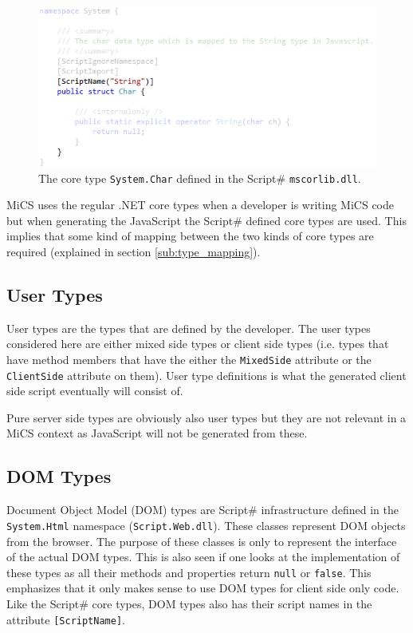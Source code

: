 	\begin{figure}[H]
			\includegraphics[width=13cm]{resources/images/Char.png}
		\caption{The core type \texttt{System.Char} defined in the Script\# \texttt{mscorlib.dll}.}
		\label{char}
	\end{figure}

		MiCS uses the regular .NET core types when a developer is writing MiCS code but when generating the JavaScript the Script\# defined core types are used. This implies that some kind of mapping between the two kinds of core types are required (explained in section \ref{sub:type_mapping}).

	\subsection{User Types} %
	\label{sub:user_types}
		User types are the types that are defined by the developer. The user types considered here are either mixed side types or client side types (i.e. types that have method members that have the either the \texttt{MixedSide} attribute or the \texttt{ClientSide} attribute on them). User type definitions is what the generated client side script eventually will consist of. 

		Pure server side types are obviously also user types but they are not relevant in a MiCS context as JavaScript will not be generated from these.

	\subsection{DOM Types} %
	\label{sub:dom_types}
		Document Object Model (DOM) types are Script\# infrastructure defined in the \texttt{System.Html} namespace (\texttt{Script.Web.dll}). These classes represent DOM objects from the browser. The purpose of these classes is only to represent the interface of the actual DOM types. This is also seen if one looks at the implementation of these types as all their methods and properties return \texttt{null} or \texttt{false}. This emphasizes that it only makes sense to use DOM types for client side only code. Like the Script\# core types, DOM types also has their script names in the attribute \texttt{[ScriptName]}.


